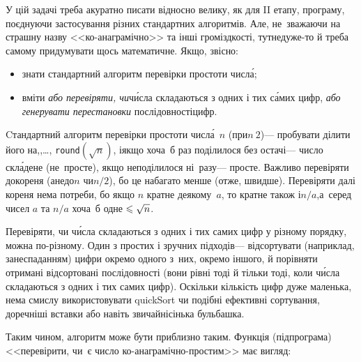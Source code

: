 \Tutorial	У цій задачі треба акуратно писати відносно велику, як для II етапу, програму, поєднуючи застосування різних стандартних алгоритмів. Але, не~зважаючи на страшну назву <<ко-ана\-гра\-мічно>> та інші громіздкості, тут\nolinebreak[2] не\nolinebreak[3] дуже-то й треба самому придумувати щось математичне. Якщо, звісно:

\begin{itemize} 

\item
знати стандартний алгоритм перевірки простоти числ\'{а};

\item
вміти \emph{або перевіряти, чи}\nolinebreak[2] ч\'{и}сла складаються з одних і тих с\'{а}мих цифр, \emph{або генерувати перестановки} послідовності\nolinebreak[3] цифр.

\end{itemize}

Cтандартний алгоритм перевірки простоти числ\'{а}~$n$ (при\nolinebreak[2] $n\>2$)\nolinebreak[3] --- пробувати ділити його на,,\nolinebreak[3] \dots, \verb"round"$(\sqrt{n})$, і\nolinebreak[3] якщо хоча~б раз поділилося без остачі\nolinebreak[3] --- число скл\'{а}дене (не~просте), якщо не\nolinebreak[3] поділилося ні~разу\nolinebreak[3] --- просте. Важливо перевіряти до\nolinebreak[2] кореня (а\nolinebreak[3] не\nolinebreak[2] до\nolinebreak[3] $n$ чи\nolinebreak[2] $n/2$), бо це набагато менше (отже, швидше). Перевіряти далі кореня нема потреби, бо якщо $n$ кратне деякому~$a$, то кратне також і\nolinebreak[2] $n/a$,\linebreak[1] а~серед чисел $a$ та $n/a$ хоча~б одне${}\leqslant\sqrt{n}$. 

Перевіряти, чи ч\'{и}сла складаються з одних і тих самих цифр у різному порядку, можна по-різному. Один з простих і зручних підходів\nolinebreak[3] --- відсортувати (наприклад, за\nolinebreak[3] неспаданням) цифри окремо одного з~них, окремо іншого, й порівняти отримані відсортовані послідовності (вони рівні тоді й тільки тоді, коли ч\'{и}сла складаються з одних і тих самих цифр). Оскільки кількість цифр дуже маленька, нема смислу використовувати quickSort чи подібні ефективні сортування, доречніші вставки або навіть звичайнісінька бульбашка.

Таким чином, алгоритм може бути приблизно таким. 
Функція (підпрограма) <<перевірити, чи~є число ко-анаграмічно-простим>> має вигляд:

